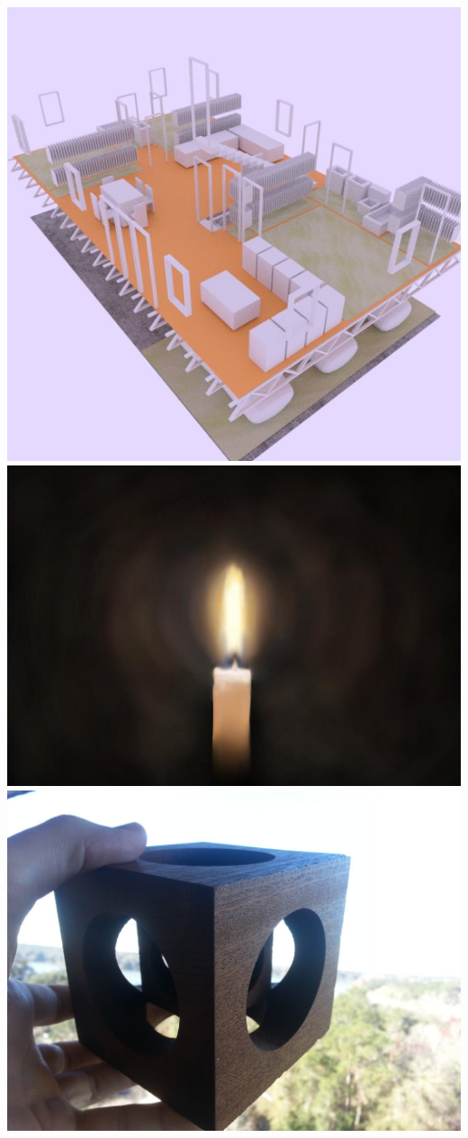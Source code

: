 \documentclass[../r.tex]{subfiles}
\begin{document}
\noindent
\href{https://twitter.com/randompast/status/763926061264490497}{\includegraphics[scale=0.175]{../fun/house.jpeg}}
\includegraphics[scale=0.2]{../fun/drawing.jpeg} 
\href{https://twitter.com/randompast/status/698518013096628224}{\includegraphics[scale=0.09]{../fun/cube.jpeg}}
\end{document}
